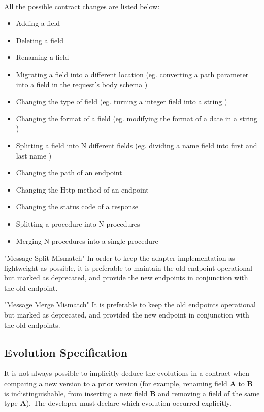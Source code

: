 \paragraph{}

All the possible contract changes are listed below:
\begin{itemize}
    \item Adding a field
    \item Deleting a field
    \item Renaming a field
    \item Migrating a field into a different location (eg. converting a path parameter into a field in the request's body schema )
    \item Changing the type of field (eg. turning a integer field into a string )
    \item Changing the format of a field (eg. modifying the format of a date in a string )
    \item Splitting a field into N different fields (eg. dividing a name field into first and last name )
    \item Changing the path of an endpoint
    \item Changing the Http method of an endpoint
    \item Changing the status code of a response
    \item Splitting a procedure into N procedures
    \item Merging N procedures into a single procedure
\end{itemize}

    "Message Split Mismatch"
    In order to keep the adapter implementation as lightweight as possible, it is preferable to maintain the old endpoint operational but marked as deprecated, and provide the new endpoints in conjunction with the old endpoint.

    "Message Merge Mismatch"
    It is preferable to keep the old endpoints operational but marked as deprecated, and provided the new endpoint in conjunction with the old endpoints.

\subsection{Evolution Specification} %
\label{sec:evolution_specification}

It is not always possible to implicitly deduce the evolutions in a contract when comparing a new version to a prior version
(for example, renaming field \textbf{A} to \textbf{B} is indistinguishable, from inserting a new field \textbf{B} and removing a field of the same type \textbf{A}).
The developer must declare which evolution occurred explicitly.

